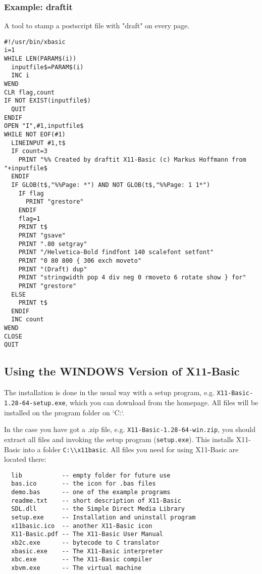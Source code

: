 \begin{mdframed}[hidealllines=true,backgroundcolor=blue!20]
\subsubsection*{Example: draftit} A tool to stamp a postscript file
with "draft" on every page.
{\footnotesize
\begin{verbatim}
#!/usr/bin/xbasic
i=1
WHILE LEN(PARAM$(i))
  inputfile$=PARAM$(i)
  INC i
WEND
CLR flag,count
IF NOT EXIST(inputfile$)
  QUIT
ENDIF  
OPEN "I",#1,inputfile$
WHILE NOT EOF(#1)
  LINEINPUT #1,t$
  IF count=3
    PRINT "%% Created by draftit X11-Basic (c) Markus Hoffmann from "+inputfile$
  ENDIF
  IF GLOB(t$,"%%Page: *") AND NOT GLOB(t$,"%%Page: 1 1*")
    IF flag
      PRINT "grestore"
    ENDIF
    flag=1
    PRINT t$
    PRINT "gsave"
    PRINT ".80 setgray"
    PRINT "/Helvetica-Bold findfont 140 scalefont setfont"
    PRINT "0 80 800 { 306 exch moveto"
    PRINT "(Draft) dup"
    PRINT "stringwidth pop 4 div neg 0 rmoveto 6 rotate show } for"
    PRINT "grestore"
  ELSE 
    PRINT t$
  ENDIF
  INC count
WEND
CLOSE
QUIT
\end{verbatim}
}
\end{mdframed}

\subsection{Using the WINDOWS Version of X11-Basic}

The installation is done in the usual way with a setup program, e.g.
\verb|X11-Basic-1.28-64-setup.exe|, which you can download from the homepage.
All files will be installed on the program folder on `C:`.

In the case you have got a .zip file, e.g. \verb|X11-Basic-1.28-64-win.zip|, 
you should extract all files and invoking the setup program (\verb|setup.exe|). 
This installs X11-Basic into a folder  \verb|C:\\x11basic|.  
All files you need for
using X11-Basic are located there:

\begin{verbatim}
  lib           -- empty folder for future use
  bas.ico       -- the icon for .bas files
  demo.bas      -- one of the example programs
  readme.txt    -- short description of X11-Basic
  SDL.dll       -- the Simple Direct Media Library
  setup.exe     -- Installation and uninstall program
  x11basic.ico  -- another X11-Basic icon
  X11-Basic.pdf -- The X11-Basic User Manual
  xb2c.exe      -- bytecode to C translator
  xbasic.exe    -- The X11-Basic interpreter
  xbc.exe       -- The X11-Basic compiler
  xbvm.exe      -- The virtual machine
\end{verbatim}

